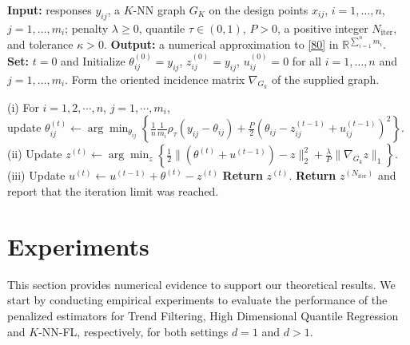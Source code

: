 \documentclass[twoside,11pt]{article}
\newcommand{\rev}[1]{{\color{revisionred}#1}}
\newenvironment{revision}{\color{revisionred}}{}
\begin{document}
\begin{algorithm}[!htbp]
\begin{revision}
   \caption{\rev{Alternating direction method of multipliers for quantile \(K\)-NN fused lasso in \eqref{80}}}
\label{alg_knn_admm}
\begin{algorithmic}[1]
    \STATE \textbf{Input:} responses \(y_{ij}\), a \(K\)-NN graph \(G_K\)
    on the design points \(x_{ij}\), \(i=1,\ldots,n\), \(j=1,\ldots,m_i\);
    penalty \(\lambda\geq0\), quantile \(\tau\in(0,1)\), \(P>0\),
    a positive integer \(N_{\text{iter}}\), and tolerance \(\kappa>0\).
   \STATE \textbf{Output:} a numerical approximation to \eqref{80}
   in \(\mathbb R^{\sum_{i=1}^n m_i}\).
   \STATE \textbf{Set:} \(t = 0\) and Initialize \( \theta_{ij}^{(0)} = y_{ij} \), \( z_{ij}^{(0)} = y_{ij} \), \( u_{ij}^{(0)} = 0 \) for all \(i = 1, \ldots, n\) and \(j = 1, \ldots, m_i\).
   \STATE Form the oriented incidence matrix $\nabla_{G_k}$ of the supplied graph.

 \STATE (i) For $i=1,2,\cdots,n $, $j = 1, \cdots, m_i$, \\ \quad update
 \( \theta_{ij}^{(t)} \leftarrow \arg\min_{\theta_{ij}} \left\{ \frac{1}{n} \frac{1}{m_i}\rho_{\tau} (y_{ij} - \theta_{ij}) + \frac{P}{2} \left( \theta_{ij} - z_{ij}^{(t-1)} + u_{ij}^{(t-1)} \right)^2 \right\}. \)
 \STATE (ii) Update
 \( z^{(t)} \leftarrow \arg\min_{z} \left\{ \frac{1}{2} \|(\theta^{(t)} + u^{(t-1)}) - z\|_2^2 + \frac{\lambda}{P} \|\nabla_{G_k} z\|_1 \right\} \).
 \STATE (iii) Update
\( u^{(t)} \leftarrow u^{(t-1)} + \theta^{(t)} - z^{(t)} \)
 \STATE \textbf{Return} \(z^{(t)}\).
 \ENDIF
\ENDFOR
\STATE \textbf{Return} \(z^{(N_{\text{iter}})}\) and report that the iteration limit was reached.
\end{algorithmic}
\end{revision}
\end{algorithm}


\section{Experiments}

This section provides numerical evidence to support our theoretical results. We start by conducting empirical experiments to evaluate the performance of the penalized estimators for Trend Filtering, High Dimensional Quantile Regression and \( K \)-NN-FL, respectively, for both settings \( d = 1 \) and \( d > 1 \). 
\end{document}
